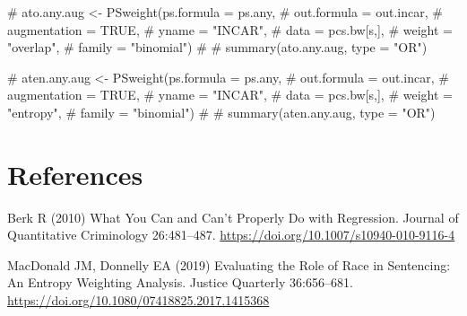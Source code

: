 \documentclass[
  letterpaper,
  DIV=11,
  numbers=noendperiod]{scrartcl}
\newenvironment{Shaded}{\begin{snugshade}}{\end{snugshade}}
\newcommand{\CommentTok}[1]{\textcolor[rgb]{0.37,0.37,0.37}{#1}}
\newlength{\cslhangindent}
\newlength{\cslentryspacingunit} %
\newenvironment{CSLReferences}[2] %
 {%
  \setlength{\parindent}{0pt}
  \ifodd #1
  \let\oldpar\par
  \def\par{\hangindent=\cslhangindent\oldpar}
  \fi
  \setlength{\parskip}{#2\cslentryspacingunit}
 }%
 {}
\begin{document}
\begin{Shaded}
\begin{Highlighting}[]
\CommentTok{\# ato.any.aug \textless{}{-} PSweight(ps.formula = ps.any, }
\CommentTok{\#                         out.formula = out.incar,}
\CommentTok{\#                         augmentation = TRUE,}
\CommentTok{\#                         yname = "INCAR", }
\CommentTok{\#                         data = pcs.bw[s,],}
\CommentTok{\#                         weight = "overlap",}
\CommentTok{\#                         family = "binomial")}
\CommentTok{\# }
\CommentTok{\# summary(ato.any.aug, type = "OR")}
\end{Highlighting}
\end{Shaded}

\begin{Shaded}
\begin{Highlighting}[]
\CommentTok{\# aten.any.aug \textless{}{-} PSweight(ps.formula = ps.any, }
\CommentTok{\#                         out.formula = out.incar,}
\CommentTok{\#                         augmentation = TRUE,}
\CommentTok{\#                         yname = "INCAR", }
\CommentTok{\#                         data = pcs.bw[s,],}
\CommentTok{\#                         weight = "entropy",}
\CommentTok{\#                         family = "binomial")}
\CommentTok{\# }
\CommentTok{\# summary(aten.any.aug, type = "OR")}
\end{Highlighting}
\end{Shaded}

\hypertarget{references}{%
\section*{References}\label{references}}

\hypertarget{refs}{}
\begin{CSLReferences}{1}{0}
\leavevmode{}%
Berk R (2010) What {You Can} and {Can}'t {Properly Do} with
{Regression}. Journal of Quantitative Criminology 26:481--487.
\url{https://doi.org/10.1007/s10940-010-9116-4}

\leavevmode{}%
MacDonald JM, Donnelly EA (2019) Evaluating the {Role} of {Race} in
{Sentencing}: {An Entropy Weighting Analysis}. Justice Quarterly
36:656--681. \url{https://doi.org/10.1080/07418825.2017.1415368}

\end{CSLReferences}
\end{document}
